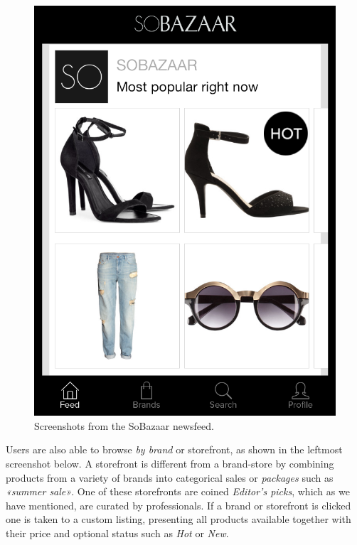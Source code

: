 \begin{figure}[H]
\begin{minipage}{.30\linewidth}
      \includegraphics[height=1.5\linewidth]{image/SoBazaarmostpop.png}
  \end{minipage}
  \caption[SoBazaar newsfeed screenshots - version 0.5.1]{Screenshots from the
  SoBazaar newsfeed.}
  \label{figure:SoBazaarfeed}
\end{figure}

Users are also able to browse \textit{by brand} or storefront, as shown in the
leftmost screenshot below. A storefront is different from a brand-store by
combining products from a variety of brands into categorical sales or
\textit{packages} such as \textit{«summer sale»}. One of these storefronts are
coined \textit{Editor's picks}, which as we have mentioned, are curated by
professionals. If a brand or storefront is clicked one is taken to a custom
listing, presenting all products available together with their price and
optional status such as \textit{Hot} or \textit{New}.

